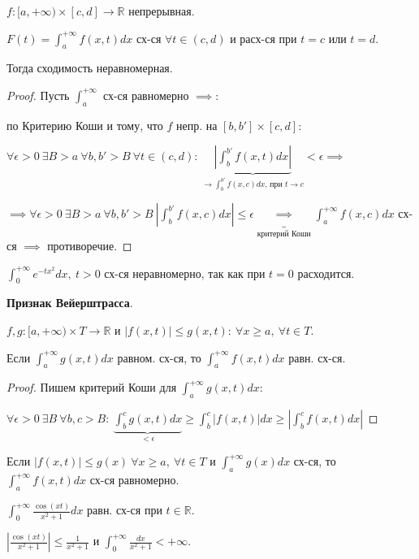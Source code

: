 \begin{consequence}
    $f: [a, +\infty) \times [c, d] \rightarrow \mathbb{R}$ непрерывная.

    $ F(t) = \int_{a}^{+\infty} { f(x, t) d x } $ сх-ся $\forall t \in (c, d)$ и расх-ся при $t=c$ или $t=d$.

    Тогда сходимость неравномерная.
\end{consequence}
\begin{proof}
    Пусть $\int_{a}^{+\infty}$ сх-ся равномерно $\implies$:

    по Критерию Коши и тому, что $f$ непр. на $[b, b'] \times [c, d]$:


    $\forall \epsilon > 0 \ \exists B > a \ \forall b, b' > B \ \forall t \in (c, d): \ \underbrace{\left| \int_{b}^{b'} { f(x, t) d x } \right|}_{\rightarrow \int_{b}^{b'} { f(x, c) d x } \text{, при } t \rightarrow c} < \epsilon \implies$

    $\implies \forall \epsilon > 0 \ \exists B > a \ \forall b, b' > B \ \left| \int_{b}^{b'} { f(x, c) dx } \right| \leq \epsilon \underbrace{\implies}_{\text{критерий Коши}} \int_{a}^{+\infty} { f(x, c) dx }$ сх-ся $\implies$ противоречие.
\end{proof}

\begin{example}
    $\int_{0}^{+\infty} { e^{-tx^2} dx }, \ t > 0$ сх-ся неравномерно, так как при $t = 0$ расходится.
\end{example}

\begin{theorem}
    \textbf{Признак Вейерштрасса}.

    $f, g: [a, +\infty) \times T \rightarrow \mathbb{R}$ и $|f(x, t)| \leq g(x, t): \ \forall x \geq a, \ \forall t \in T$.

    Если $\int_{a}^{+\infty} { g(x, t) dx }$ равном. сх-ся, то $\int_{a}^{+\infty} { f(x, t) dx }$ равн. сх-ся.
\end{theorem}
\begin{proof}
    Пишем критерий Коши для $\int_{a}^{+\infty} { g(x, t) dx }$:

    $\forall \epsilon > 0 \ \exists B \ \forall b, c > B: \ \underbrace{\int_{b}^{c} { g(x, t) dx }}_{< \epsilon} \geq \int_{b}^{c} { |f(x, t)| dx } \geq \left| \int_{b}^{c} { f(x, t) d x } \right|$
\end{proof}

\begin{consequence}
    Если $\left| f(x, t) \right| \leq g(x) \ \forall x \geq a, \ \forall t \in T$ и $\int_{a}^{+\infty} { g(x) dx }$ сх-ся, то $\int_{a}^{+\infty} { f(x, t) dx }$ сх-ся равномерно.
\end{consequence}
\begin{example}
    $\int_{0}^{+\infty} { \frac{\cos(xt)}{x^2 + 1} dx }$ равн. сх-ся при $t \in \mathbb{R}$.

    $\left| \frac{\cos(xt)}{x^2 + 1} \right| \leq \frac{1}{x^2 + 1}$ и $\int_0^{+\infty} { \frac{dx}{x^2+1} } < +\infty$.
\end{example}

